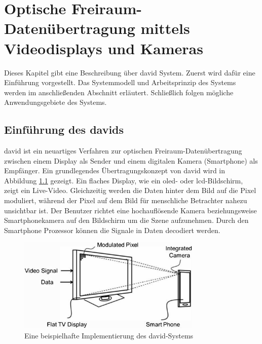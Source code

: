 \chapter{Optische Freiraum-Datenübertragung mittels Videodisplays und Kameras}


Dieses Kapitel gibt eine Beschreibung über \gls{david} System. Zuerst wird dafür eine Einführung vorgestellt. Das Systemmodell und Arbeitsprinzip des Systems werden im anschließenden Abschnitt erläutert. Schließlich folgen mögliche Anwendungsgebiete des Systems. %




\section{Einführung des \gls{david}s} 

\gls{david} \cite{Kays201501} ist ein neuartiges Verfahren zur optischen Freiraum-Datenübertragung zwischen einem Display als Sender und einem digitalen Kamera (Smartphone) als Empfänger. Ein grundlegendes Übertragungskonzept von \gls{david} wird in Abbildung \ref{fig:David1} gezeigt. Ein flaches Display, wie ein \gls{oled}- oder \gls{lcd}-Bildschirm, zeigt ein Live-Video. Gleichzeitig werden die Daten hinter dem Bild auf die Pixel moduliert, während der Pixel auf dem Bild für menschliche Betrachter nahezu unsichtbar ist. Der Benutzer richtet eine hochauflösende Kamera beziehungsweise Smartphonekamera auf den Bildschirm um die Szene aufzunehmen. Durch den Smartphone Prozessor können die Signale  in Daten decodiert werden.

\begin{figure}[H]
 \centering 
 \includegraphics[keepaspectratio,width=0.78\textwidth]{images/2_DaViD/David1.pdf}
 \caption{Eine beispielhafte Implementierung des \gls{david}-Systems \cite{Kays201502}}
 \label{fig:David1}
\end{figure}



